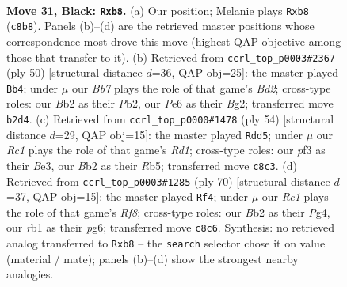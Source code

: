 \documentclass[11pt]{article}
\begin{document}
\clearpage

\begin{figure}[p]\centering
\begin{subfigure}{0.46\textwidth}\centering
\resizebox{\linewidth}{!}{%
\newchessgame
\chessboard[
  setfen={1Br5/1p3pk1/p3p3/8/7p/4PP2/Pb4PP/1R2R1K1 b - - 1 31},
  showmover=false,
  pgfstyle=straightmove, color=movearrow, markmove={c8-b8}
]}
\caption{}
\end{subfigure}\hfill
\begin{subfigure}{0.46\textwidth}\centering
\resizebox{\linewidth}{!}{%
\newchessgame
\chessboard[
  setfen={4kr2/1p3p1p/p7/8/3K2P1/Pb5P/1PrB1PB1/7R w - - 0 26},
  showmover=false,
  pgfstyle=straightmove, color=movearrow, markmove={d2-b4}
]}
\caption{}
\end{subfigure}
\\[4pt]
\begin{subfigure}{0.46\textwidth}\centering
\resizebox{\linewidth}{!}{%
\newchessgame
\chessboard[
  setfen={rr4k1/5ppp/5b2/1R6/p7/4B2P/P4PP1/3R2K1 w - - 2 28},
  showmover=false,
  pgfstyle=straightmove, color=movearrow, markmove={d1-d5}
]}
\caption{}
\end{subfigure}\hfill
\begin{subfigure}{0.46\textwidth}\centering
\resizebox{\linewidth}{!}{%
\newchessgame
\chessboard[
  setfen={1B2bR2/4k3/1p2r1p1/2p5/p5P1/P2P1P2/1P3K2/8 w - - 5 36},
  showmover=false,
  pgfstyle=straightmove, color=movearrow, markmove={f8-f4}
]}
\caption{}
\end{subfigure}
\caption{\textbf{Move 31, Black: \texttt{Rxb8}.} (a) Our position; Melanie plays \texttt{Rxb8} (\texttt{c8b8}). Panels (b)--(d) are the retrieved master positions whose correspondence most drove this move (highest QAP objective among those that transfer to it). (b) Retrieved from \texttt{ccrl\_top\_p0003\#2367} (ply 50) [structural distance $d$=36, QAP obj=25]: the master played \texttt{Bb4}; under $\mu$ our \emph{Bb7} plays the role of that game's \emph{Bd2}; cross-type roles: our \emph{B}b2 as their \emph{P}b2, our \emph{P}e6 as their \emph{B}g2; transferred move \texttt{b2d4}. (c) Retrieved from \texttt{ccrl\_top\_p0000\#1478} (ply 54) [structural distance $d$=29, QAP obj=15]: the master played \texttt{Rdd5}; under $\mu$ our \emph{Rc1} plays the role of that game's \emph{Rd1}; cross-type roles: our \emph{p}f3 as their \emph{B}e3, our \emph{B}b2 as their \emph{R}b5; transferred move \texttt{c8c3}. (d) Retrieved from \texttt{ccrl\_top\_p0003\#1285} (ply 70) [structural distance $d$=37, QAP obj=15]: the master played \texttt{Rf4}; under $\mu$ our \emph{Rc1} plays the role of that game's \emph{Rf8}; cross-type roles: our \emph{B}b2 as their \emph{P}g4, our \emph{r}b1 as their \emph{p}g6; transferred move \texttt{c8c6}. Synthesis: no retrieved analog transferred to \texttt{Rxb8} -- the \texttt{search} selector chose it on value (material / mate); panels (b)--(d) show the strongest nearby analogies.}
\label{fig:thought-m61}
\end{figure}
\end{document}

